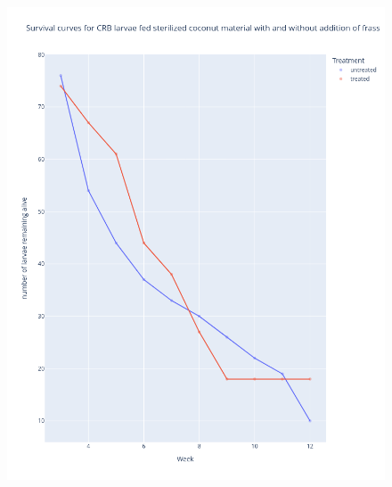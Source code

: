 \documentclass[12pt,letterpaper,english,bibliography=totocnumbered, abstract=on]{scrartcl}
\begin{document}
\begin{figure}[H]
	\centering
	\includegraphics[width=0.8\linewidth]{images/symbiont_survival}
	\caption{}
	\label{fig:symbiontsurvival}
\end{figure}

\newpage

\printbibliography
\end{document}
